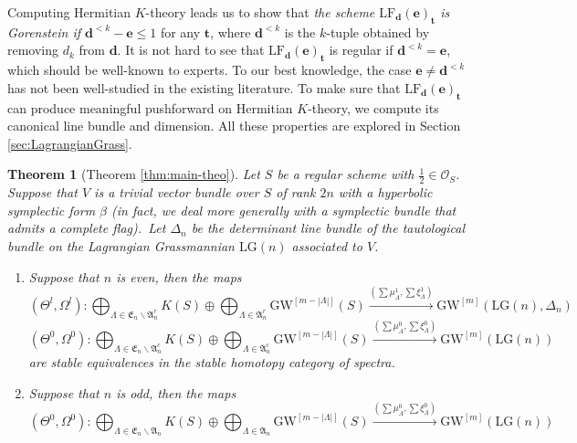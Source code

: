 \documentclass[a4paper]{amsart}
\theoremstyle{plain}
\newtheorem{theorem}{Theorem}[section]
\theoremstyle{definition}
\numberwithin{equation}{section}
\newcommand{\GW}{\mathrm{GW}}
\newcommand{\LG}{\mathrm{LG}}
\newcommand{\SO}{\mathcal{O}}
\newcommand{\LF}{\mathrm{LF}}
\begin{document}
Computing Hermitian $K$-theory leads us to show that \textit{the scheme $\LF_{\mathbf{d}}(\mathbf{e})_{\mathbf{t}}$ is Gorenstein if $\mathbf{d}^{< k} - \mathbf{e} \leq 1$} for any $\mathbf{t}$, where $\mathbf{d}^{< k}$ is the $k$-tuple obtained by removing $d_k$ from $\mathbf{d}$. It is not hard to see that $\LF_{\mathbf{d}}(\mathbf{e})_{\mathbf{t}}$ is regular if $\mathbf{d}^{< k} = \mathbf{e}$, which should be well-known to experts. To our best knowledge, the case $ \mathbf{e} \neq \mathbf{d}^{< k}$ has not been well-studied in the existing literature. To make sure that $\LF_{\mathbf{d}}(\mathbf{e})_{\mathbf{t}}$ can produce meaningful pushforward on Hermitian $K$-theory, we compute its canonical line bundle and dimension. All these properties are explored in Section \ref{sec:LagrangianGrass}.


\begin{theorem}[Theorem \ref{thm:main-theo}]\label{thm:main-theo-intro}
    Let $S$ be a regular scheme with $\frac{1}{2} \in \SO_S$. Suppose that $V$ is a trivial vector bundle over $S$ of rank $2n$ with a hyperbolic symplectic form $\beta$ (in fact, we deal more generally with a symplectic bundle that admits a complete flag).\	Let $\Delta_n$ be the determinant line bundle of the tautological bundle on the Lagrangian Grassmannian $\LG(n)$ associated to $V$.
    \begin{enumerate}[leftmargin=20pt,label={\rm (\alph*)},ref=(\alph*)]
        \item Suppose that $n$ is even, then the maps
              \[   (\Theta^l, \Omega^l): \bigoplus_{\Lambda \in \mathfrak{E}_n \backslash \mathfrak{A}_n^r } K(S) \oplus \bigoplus_{\Lambda \in \mathfrak{A}_{n}^r} \GW^{[m-|\Lambda|]}(S) \xrightarrow{ (\sum \mu_\Lambda^1, \sum\xi^1_\Lambda)} \GW^{[m]}(\LG(n), \Delta_n)
              \]
              \[
                  (\Theta^0, \Omega^0): \bigoplus_{\Lambda \in \mathfrak{E}_n \backslash \mathfrak{A}_n^c } K(S) \oplus \bigoplus_{\Lambda \in \mathfrak{A}_{n}^c} \GW^{[m-|\Lambda|]}(S) \xrightarrow{ (\sum \mu_\Lambda^0, \sum \xi_\Lambda^0)} \GW^{[m]}(\LG(n))
              \]
              are stable equivalences in the stable homotopy category of spectra.
        \item Suppose that $n$ is odd, then the maps
              \[
                  (\Theta^0, \Omega^0): \bigoplus_{\Lambda \in \mathfrak{E}_n \backslash \mathfrak{A}_n} K(S) \oplus \bigoplus_{\Lambda \in \mathfrak{A}_n} \GW^{[m-|\Lambda|]}(S) \xrightarrow{ (\sum \mu_\Lambda^0, \sum \xi_\Lambda^0)} \GW^{[m]}(\LG(n))
              \]

\end{enumerate}
\end{theorem}
\end{document}
